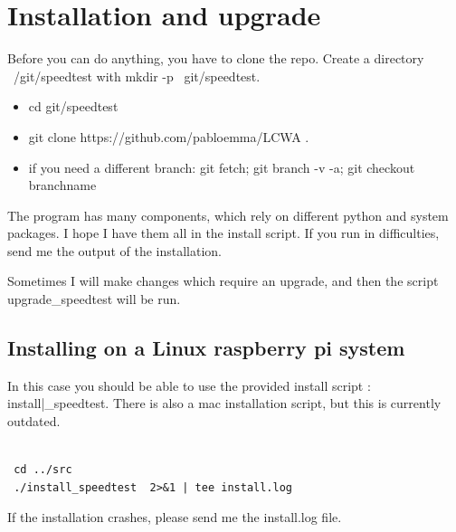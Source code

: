 \documentclass[11pt]{article}
\begin{document}
\section{Installation and upgrade}

Before you can do anything, you have to clone the repo. Create a directory ~/git/speedtest with mkdir -p ~git/speedtest.

\begin{itemize}
\item cd git/speedtest
\item git clone https://github.com/pabloemma/LCWA .
\item if you need a different branch: git fetch; git branch -v -a; git checkout branchname

\end{itemize}
The program has many components, which rely on different python and system packages. I hope I have them all in the install script. If you run in difficulties, send me the output of the installation.

Sometimes I will make changes which require an upgrade, and then the script upgrade\_speedtest will be run.

\vspace{3cm}

\subsection{Installing on a Linux raspberry pi system}
In this case you should be able to use the provided install script : install|\_speedtest. There is also a mac installation script, but this is currently outdated.
\begin{verbatim}

 cd ../src
 ./install_speedtest  2>&1 | tee install.log
\end{verbatim}

If the installation crashes, please send me the install.log file.
\end{document}
